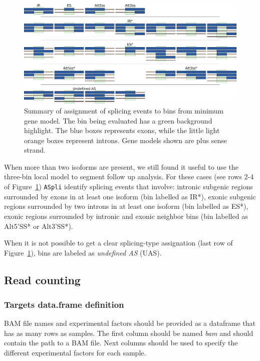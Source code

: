 \documentclass{article}
\begin{document}
\begin{figure}[ht!]
\centering
\includegraphics[width=1.3\textwidth]{images/event_assignment.pdf}
\caption{ Summary of assignment of splicing events to bins from minimum gene model. The bin being evaluated has a green background highlight. The blue boxes represents exons, while the little light orange boxes represent introns. Gene
models shown are plus sense strand. }
\label{fig:binAssignment}
\end{figure}

When more than two isoforms are present, we still found it useful to use the three-bin local model to segment follow up analysis. For these cases (see rows 2-4 of Figure~\ref{fig:binAssignment}) \texttt{ASpli} identify splicing events that involve: intronic subgenic regions surrounded by exons in at least one isoform (bin labelled as IR*), exonic subgenic regions surrounded by two introns in at least one isoform (bin labelled as ES*), exonic regions surrounded by intronic and exonic neighbor bins (bin labelled as Alt5'SS* or Alt3'SS*). 

When it is not possible to get a clear splicing-type assignation (last row of Figure~\ref{fig:binAssignment}), bins are labeled as {\em undefined AS} (UAS).  \\



\subsection{Read counting}\label{sec:rcounts}

\subsubsection{Targets data.frame definition}\label{sec:targetsDef}

BAM file names and experimental factors should be provided as a dataframe 
that has as many rows as samples. The first column  should be named \textit{bam} and should contain the path to a BAM file. Next columns should be used to specify the different experimental factors for each sample.
\end{document}
